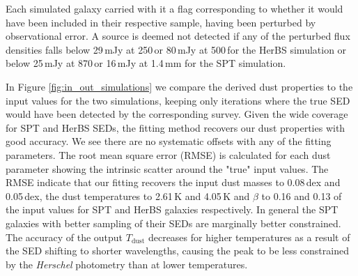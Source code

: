 Each simulated galaxy carried with it a flag corresponding to whether it would have been included in their respective sample, having been perturbed by observational error. A source is deemed not detected if any of the perturbed flux densities falls below 29\,mJy at 250\,\micron or 80\,mJy at 500\,\micron for the HerBS simulation or below 25\,mJy at 870\,\micron or 16\,mJy at 1.4\,mm for the SPT simulation.

In Figure \ref{fig:in_out_simulations} we compare the derived dust properties to the input values for the two simulations, keeping only iterations where the true SED would have been detected by the corresponding survey. Given the wide coverage for SPT and HerBS SEDs, the fitting method recovers our dust properties with good accuracy. We see there are no systematic offsets with any of the fitting parameters. The root mean square error (RMSE) is calculated for each dust parameter showing the intrinsic scatter around the "true" input values. The RMSE indicate that our fitting recovers the input dust masses to {\color{red} 0.08}\,dex and {\color{red}0.05}\,dex, the dust temperatures to {\color{red} 2.61}\,K and {\color{red} 4.05}\,K and $\beta$ to {\color{red} 0.16} and {\color{red} 0.13} of the input values for SPT and HerBS galaxies respectively. In general the SPT galaxies with better sampling of their SEDs are marginally better constrained. The accuracy of the output $T_{\textrm{dust}}$ decreases for higher temperatures as a result of the SED shifting to shorter wavelengths, causing the peak to be less constrained by the \textit{Herschel} photometry than at lower temperatures.

